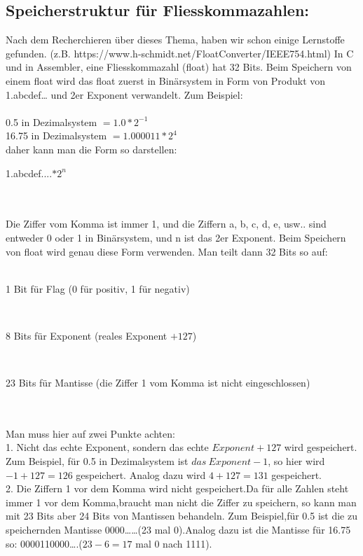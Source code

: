 \documentclass[11pt]{article}
\begin{document}
\begin{large}
\subsection{Speicherstruktur f\"ur Fliesskommazahlen:}

Nach dem Recherchieren \"uber dieses Thema, haben wir schon einige Lernstoffe gefunden. (z.B. https://www.h-schmidt.net/FloatConverter/IEEE754.html) In C und in Assembler, eine Fliesskommazahl (float) hat 32 Bits. Beim Speichern von einem float wird das float zuerst in Bin\"arsystem in Form von Produkt von 1.abcdef… und 2er Exponent verwandelt. Zum Beispiel:\\\\
0.5 in Dezimalsystem $ = 1.0 * 2^{-1}$\\
16.75 in Dezimalsystem $ = 1.000011 * 2^{4}$\\
daher kann man die Form so darstellen:\\
 \centerline{1.abcdef....$*2^n$}\\\\
 Die Ziffer vom Komma ist immer 1, und die Ziffern a, b, c, d, e, usw.. sind entweder 0 oder 1 in Bin\"arsystem, und n ist das 2er Exponent. Beim Speichern von float wird genau diese Form verwenden. Man teilt dann 32 Bits so auf:\\\\
 \centerline{1 Bit f\"ur Flag (0 f\"ur positiv, 1 f\"ur negativ)} \\ 
\centerline{8 Bits f\"ur Exponent (reales Exponent $+ 127$)}\\
 \centerline{23 Bits f\"ur Mantisse (die Ziffer 1 vom Komma ist nicht eingeschlossen)}\\\\
Man muss hier auf zwei Punkte achten: \\
{\Large 1.}  Nicht das echte Exponent, sondern das echte $ Exponent + 127$ wird gespeichert. Zum Beispiel, f\"ur 0.5 in Dezimalsystem ist $das \  Exponent-1$, so hier wird $-1 + 127 = 126$ gespeichert. Analog dazu wird $4 + 127 = 131$ gespeichert.\\
{\Large 2.} Die Ziffern 1 vor dem Komma wird nicht gespeichert.Da f\"ur alle Zahlen steht immer 1 vor dem Komma,braucht man nicht die Ziffer zu speichern, so kann man mit 23 Bits aber 24 Bits von Mantissen behandeln. Zum Beispiel,f\"ur 0.5 ist die zu speichernden Mantisse 0000……(23 mal 0).Analog dazu ist die Mantisse f\"ur 16.75 so: 0000110000….($23 - 6 = 17$ mal 0 nach 1111).\\

\end{large}
\end{document}
